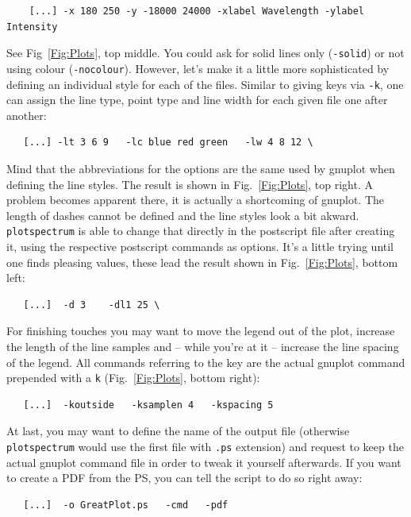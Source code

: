 \documentclass[12pt, a4paper]{article}
\begin{document}
\begin{verbatim}
    [...] -x 180 250 -y -18000 24000 -xlabel Wavelength -ylabel Intensity
\end{verbatim}

See Fig~\ref{Fig:Plots}, top middle. You could ask for solid lines only (\verb'-solid') or not using colour (\verb'-nocolour'). However, let's make it a little more sophisticated by defining an individual style for each of the files. Similar to giving keys via \verb'-k', one can assign the line type, point type and line width for each given file one after another:

\begin{verbatim}
   [...] -lt 3 6 9   -lc blue red green   -lw 4 8 12 \
\end{verbatim}

Mind that the abbreviations for the options are the same used by gnuplot when defining the line styles. The result is shown in Fig.~\ref{Fig:Plots}, top right. A problem becomes apparent there, it is actually a shortcoming of gnuplot. The length of dashes cannot be defined and the line styles look a bit akward. \verb'plotspectrum' is able to change that directly in the postscript file after creating it, using the respective postscript commands as options. It's a little trying until one finds pleasing values, these lead the result shown in Fig.~\ref{Fig:Plots}, bottom left:

\begin{verbatim}
   [...]  -d 3    -dl1 25 \
\end{verbatim}

For finishing touches you may want to move the legend out of the plot, increase the length of the line samples and -- while you're at it -- increase the line spacing of the legend. All commands referring to the key are the actual gnuplot command prepended with a \verb'k' (Fig.~\ref{Fig:Plots}, bottom right):

\begin{verbatim}
   [...]  -koutside   -ksamplen 4   -kspacing 5
\end{verbatim}

At last, you may want to define the name of the output file (otherwise \verb'plotspectrum' would use the first file with \verb'.ps' extension) and request to keep the actual gnuplot command file in order to tweak it yourself afterwards. If you want to create a PDF from the PS, you can tell the script to do so right away:

\begin{verbatim}
   [...]  -o GreatPlot.ps   -cmd   -pdf
\end{verbatim}
\end{document}
